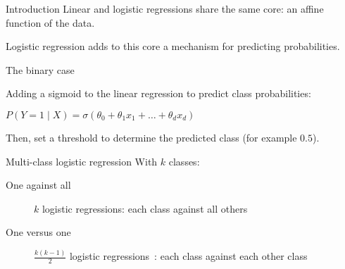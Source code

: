 \begin{frame}{Introduction}
  Linear and logistic regressions share the same core: an affine function of the data.
  
  Logistic regression adds to this core a mechanism for predicting probabilities.
\end{frame}

\begin{frame}{The binary case}
  \begin{center}
  \end{center}

  Adding a sigmoid to the linear regression to predict class probabilities:
  \begin{center}
    $P(Y = 1 \mid X) = \sigma(\theta_0 + \theta_1 x_1 + \dots + \theta_d x_d)$
  \end{center}

  Then, set a threshold to determine the predicted class (for example $0.5$).
\end{frame}

\begin{frame}{Multi-class logistic regression}
  With $k$ classes:

  \begin{description}
  \item[One against all] $k$ logistic regressions: each class against all others
  \item[One versus one] $\frac{k(k - 1)}{2}$ logistic regressions~: each class against each other class
  \end{description}
\end{frame}
